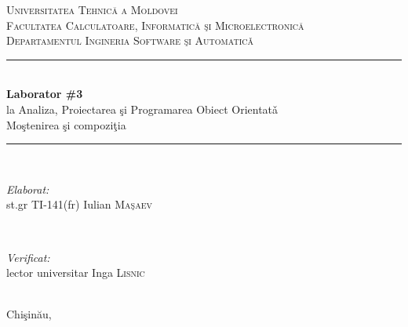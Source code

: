 \documentclass[12pt]{article}
\begin{document}
\begin{titlepage}

\newcommand{\HRule}{\rule{\linewidth}{0.5mm}} 

\center 
 

\textsc{\LARGE Universitatea Tehnic\u{a} a Moldovei}\\[0.8cm] 
\textsc{\Large Facultatea Calculatoare, Informatic\u{a} \c{s}i Microelectronic\u{a}}\\[0.5cm] 
\textsc{\large Departamentul Ingineria Software \c{s}i Automatic\v{a}}\\[5.2cm] 

\HRule \\[0.4cm]
{ \huge \bfseries Laborator \#3}\\[0.3cm]
{\large la Analiza, Proiectarea \c{s}i Programarea Obiect Orientat\v{a}}\\
{\large Mo\c{s}tenirea \c{s}i compozi\c{t}ia}\\[0.4cm] 
\HRule \\[5.5cm]
 

\begin{minipage}{0.4\textwidth}
\begin{flushleft} \large
\emph{Elaborat:}\\
st.gr TI-141(fr) Iulian \textsc{Ma\c{s}aev} 
\end{flushleft}
\end{minipage}
~
\begin{minipage}{0.4\textwidth}
\begin{flushright} \large
\emph{Verificat:} \\
lector universitar Inga \textsc{Lisnic} 
\end{flushright}
\end{minipage}\\[4cm]


\vfill 
{\large Chi\c{s}in\u{a}u, \the\year}\\[3cm] 



\end{titlepage}

%


%


\end{document}

